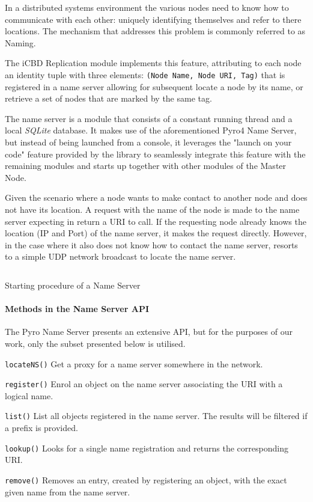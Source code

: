 In a distributed systems environment the various nodes need to know how to communicate with each other: uniquely identifying themselves and refer to there locations. The mechanism that addresses this problem is commonly referred to as Naming.~\cite{tanenbaum_2006}

The iCBD Replication module implements this feature, attributing to each node an identity tuple with three elements: \texttt{(Node Name, Node URI, Tag)} that is registered in a name server allowing for subsequent locate a node by its name, or retrieve a set of nodes that are marked by the same tag.

The name server is a module that consists of a constant running thread and a local \textit{SQLite} database. It makes use of the aforementioned Pyro4 Name Server, but instead of being launched from a console, it leverages the "launch on your code" feature provided by the library to seamlessly integrate this feature with the remaining modules and starts up together with other modules of the Master Node.

Given the scenario where a node wants to make contact to another node and does not have its location. A request with the name of the node is made to the name server expecting in return a URI to call. If the requesting node already knows the location (IP and Port) of the name server, it makes the request directly. However, in the case where it also does not know how to contact the name server, resorts to a simple UDP network broadcast to locate the name server.

\begin{listing}[ht]
\inputminted{python}{./Chapters/Code/cap4_NameServer.py}
\caption{Starting procedure of a Name Server}
\label{listing:impl_icbd_nameserver}
\end{listing}

\paragraph{Methods in the Name Server API}

The Pyro Name Server presents an extensive API, but for the purposes of our work, only the subset presented below is utilised. 

\begin{description}
	\item \texttt{locateNS()} Get a proxy for a name server somewhere in the network.
	\item \texttt{register()} Enrol an object on the name server associating the URI with a logical name.
	\item \texttt{list()} List all objects registered in the name server. The results will be filtered if a prefix is provided.
	\item \texttt{lookup()} Looks for a single name registration and returns the corresponding URI.
	\item \texttt{remove()} Removes an entry, created by registering an object, with the exact given name from the name server.
\end{description}





